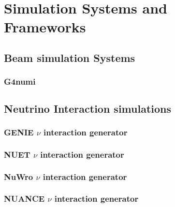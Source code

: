 %
\chapter{Simulation Systems and Frameworks}  %
\section{Beam simulation Systems}

\subsection{G4numi}


\section{Neutrino Interaction simulations}

\subsection{GENIE $\nu$ interaction generator}

\subsection{NUET $\nu$ interaction generator}

\subsection{NuWro $\nu$ interaction generator}

\subsection{NUANCE $\nu$ interaction generator}

